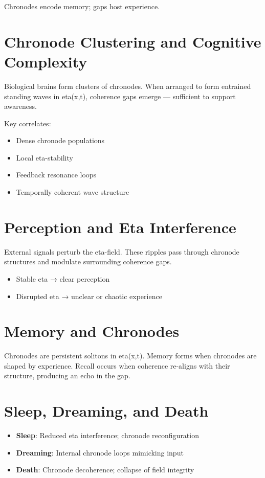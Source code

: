 \documentclass[12pt]{article}
\begin{document}
Chronodes encode memory; gaps host experience.

\section{Chronode Clustering and Cognitive Complexity}

Biological brains form clusters of chronodes. When arranged to form entrained standing waves in eta(x,t), coherence gaps emerge — sufficient to support awareness.

Key correlates:

\begin{itemize}
\item Dense chronode populations
\item Local eta-stability
\item Feedback resonance loops
\item Temporally coherent wave structure
\end{itemize}

\section{Perception and Eta Interference}

External signals perturb the eta-field. These ripples pass through chronode structures and modulate surrounding coherence gaps.

\begin{itemize}
\item Stable eta → clear perception
\item Disrupted eta → unclear or chaotic experience
\end{itemize}

\section{Memory and Chronodes}

Chronodes are persistent solitons in eta(x,t). Memory forms when chronodes are shaped by experience. Recall occurs when coherence re-aligns with their structure, producing an echo in the gap.

\section{Sleep, Dreaming, and Death}

\begin{itemize}
\item \textbf{Sleep}: Reduced eta interference; chronode reconfiguration
\item \textbf{Dreaming}: Internal chronode loops mimicking input
\item \textbf{Death}: Chronode decoherence; collapse of field integrity
\end{itemize}
\end{document}
